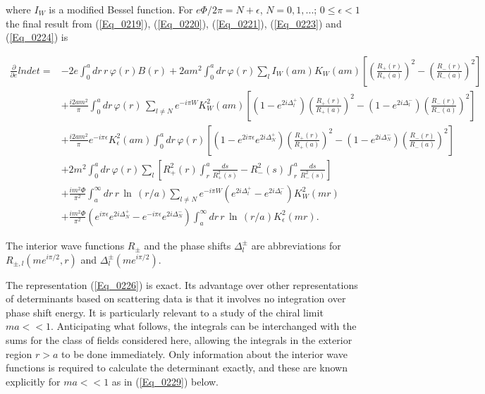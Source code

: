 \documentclass[a4paper,twocolumn,showpacs,preprintnumbers,amsmath,amssymb]{revtex4}
\newcommand{\pdo}[1]{\ensuremath{\frac{\partial }
        {\partial #1 }}}
\begin{document}
\noindent
where $I_W$ is a modified Bessel function. For
$e\Phi/2\pi = N + \epsilon$, $N = 0, 1,...$; $0 \leq \epsilon < 1$
the final result from (\ref{Eq_0219}), (\ref{Eq_0220}),
(\ref{Eq_0221}), (\ref{Eq_0223}) and (\ref{Eq_0224}) is


\begin{widetext}
\begin{equation}
\label{Eq_0226}
\begin{split}
\pdo{e}lndet
  =& -2 e \int^a_0 dr \, r \, \varphi(r) B(r)
  + 2am^2 \int^a_0 dr \, \varphi(r) \sum_l I_W(am) K_W(am)
  \left[
  \left(\frac{R_{+}(r)}{R_{+}(a)}\right)^2 
  - \left(\frac{R_{-}(r)}{R_{-}(a)}\right)^2
  \right]\\
  &+ \frac{i2am^2}{\pi} \int^a_0 dr \, \varphi(r) \,
  \sum_{l \neq N} e^{-i \pi W} K^2_W(am)
  \left[
  (1 - e^{2i\Delta^{+}_l}) \left(\frac{R_{+}(r)}{R_{+}(a)}\right)^2
  - (1 - e^{2i\Delta^{-}_l}) \left(\frac{R_{-}(r)}{R_{-}(a)}\right)^2
  \right]\\
  &+ \frac{i2am^2}{\pi} e^{-i \pi \epsilon} K^2_{\epsilon}(am)
  \int^a_0 dr \, \varphi(r)
  \left[
  (1 - e^{2i\pi\epsilon} e^{2i\Delta^{+}_N})\left(\frac{R_{+}(r)}{R_{+}(a)}\right)^2
  - (1 - e^{2i\Delta^{-}_N})\left(\frac{R_{-}(r)}{R_{-}(a)}\right)^2
  \right]\\
  &+ 2 m^2 \int^a_0 dr \, \varphi(r)
  \sum_l
  \left[
  R^2_{+}(r) \int^a_r \frac{ds}{R^2_{+}(s)}
  - R^2_{-}(s) \int^a_r \frac{ds}{R^2_{-}(s)}
  \right]\\
  &+ \frac{i m^2 \Phi}{\pi^2} \int^{\infty}_a dr \, r \,
  \ln \, (r/a)
  \sum_{l \neq N}
  e^{-i\pi W}(e^{2i\Delta^{+}_l} - e^{2i \Delta^{-}_l})
  K^2_W(mr)\\
  &+ \frac{im^2 \Phi}{\pi^2} (e^{i\pi\epsilon}
  e^{2i\Delta^{+}_N} - e^{- i\pi\epsilon}e^{2i\Delta^{-}_N})
  \int^{\infty}_a dr \, r \,
  \ln \, (r/a) K^2_{\epsilon}(mr).
\end{split}
\end{equation}
\end{widetext}


\noindent
The interior wave functions $R_{\pm}$ and the phase shifts
$\Delta^{\pm}_l$ are abbreviations for $R_{\pm, l}(me^{i\pi/2}, r)$
and $\Delta^{\pm}_l(me^{i\pi/2})$.

The representation (\ref{Eq_0226}) is exact. Its advantage over other
representations of determinants based on scattering data is that it
involves no integration over phase shift energy. It is particularly
relevant to a study of the chiral limit $ma<<1$. Anticipating what follows,
the integrals can be interchanged with the sums for the class of fields
considered here, allowing the integrals in the exterior region $r>a$
to be done immediately. Only information about the interior wave
functions is required to calculate the determinant exactly, and these
are known explicitly for $ma<<1$ as in (\ref{Eq_0229}) below.
\end{document}
